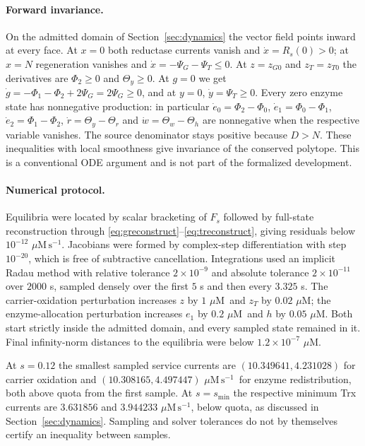 \documentclass[11pt,a4paper]{article}
\theoremstyle{plain}
\theoremstyle{definition}
\theoremstyle{remark}
\newcommand{\uM}{\ensuremath{\mu\mathrm{M}}}
\newcommand{\fluxunit}{\ensuremath{\mu\mathrm{M}\,\mathrm{s}^{-1}}}
\begin{document}
\paragraph{Forward invariance.}
On the admitted domain of Section~\ref{sec:dynamics} the vector field points
inward at every face. At $x=0$ both reductase currents vanish and
$\dot x=R_s(0)>0$; at $x=N$ regeneration vanishes and $\dot x=-\Psi_G-\Psi_T\le0$.
At $z=z_{G0}$ and $z_T=z_{T0}$ the derivatives are $\Phi_2\ge0$ and
$\Theta_y\ge0$. At $g=0$ we get $\dot g=-\Phi_1-\Phi_2+2\Psi_G=2\Psi_G\ge0$, and
at $y=0$, $\dot y=\Psi_T\ge0$. Every zero enzyme state has nonnegative production:
in particular $\dot e_0=\Phi_2-\Phi_0$, $\dot e_1=\Phi_0-\Phi_1$,
$\dot e_2=\Phi_1-\Phi_2$, $\dot r=\Theta_y-\Theta_r$ and $\dot w=\Theta_w-\Theta_h$
are nonnegative when the respective variable vanishes. The source denominator stays
positive because $D>N$. These inequalities with local smoothness give invariance of
the conserved polytope. This is a conventional ODE argument and is not part of the
formalized development.

\paragraph{Numerical protocol.}
Equilibria were located by scalar bracketing of $F_s$ followed by full-state
reconstruction through \eqref{eq:greconstruct}--\eqref{eq:treconstruct}, giving
residuals below $10^{-12}$ \fluxunit. Jacobians were formed by complex-step
differentiation with step $10^{-20}$, which is free of subtractive cancellation.
Integrations used an implicit Radau method with relative tolerance
$2\times10^{-9}$ and absolute tolerance $2\times10^{-11}$ over $2000$ s, sampled
densely over the first $5$ s and then every $3.325$ s. The carrier-oxidation
perturbation increases $z$ by $1$ \uM\ and $z_T$ by $0.02$ \uM; the
enzyme-allocation perturbation increases $e_1$ by $0.2$ \uM\ and $h$ by
$0.05$ \uM. Both start strictly inside the admitted domain, and every sampled
state remained in it. Final infinity-norm distances to the equilibria were below
$1.2\times10^{-7}$ \uM.

At $s=0.12$ the smallest sampled service currents are $(10.349641,4.231028)$ for
carrier oxidation and $(10.308165,4.497447)$ \fluxunit\ for enzyme
redistribution, both above quota from the first sample. At $s=s_{\min}$ the
respective minimum Trx currents are $3.631856$ and $3.944233$ \fluxunit, below
quota, as discussed in Section~\ref{sec:dynamics}. Sampling and solver tolerances
do not by themselves certify an inequality between samples.
\end{document}
